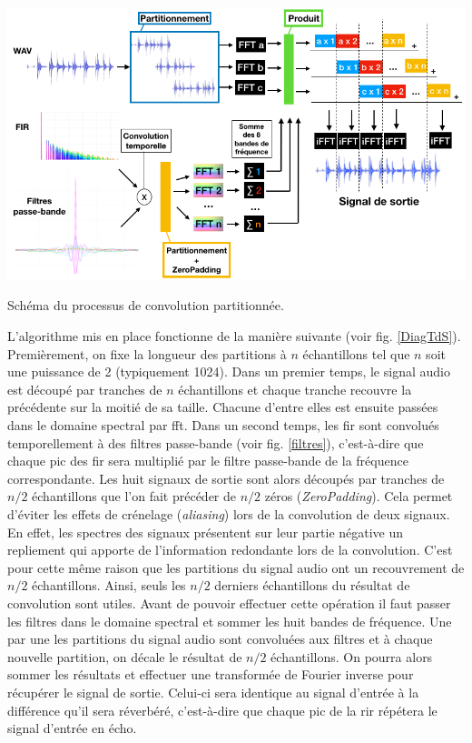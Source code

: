 \begin{figureth}
	\includegraphics[width=\linewidth]{images/DiagTdS}
	\caption{Schéma du processus de convolution partitionnée.}
	\label{DiagTdS}
\end{figureth}
L'algorithme mis en place fonctionne de la manière suivante (voir fig. \ref{DiagTdS}). Premièrement, on fixe la longueur des partitions à $n$ échantillons tel que $n$ soit une puissance de 2 (typiquement 1024). Dans un premier temps, le signal audio est découpé par tranches de $n$ échantillons et chaque tranche recouvre la précédente sur la moitié de sa taille. Chacune d'entre elles est ensuite passées dans le domaine spectral par \gls{fft}. Dans un second temps, les \gls{fir} sont convolués temporellement à des filtres passe-bande (voir fig. \ref{filtres}), c'est-à-dire que chaque pic des \gls{fir} sera multiplié par le filtre passe-bande de la fréquence correspondante. Les huit signaux de sortie sont alors découpés par tranches de $n/2$ échantillons que l'on fait précéder de $n/2$ zéros (\textit{ZeroPadding}). Cela permet d'éviter les effets de crénelage (\textit{aliasing}) lors de la convolution de deux signaux. En effet, les spectres des signaux présentent sur leur partie négative un repliement qui apporte de l'information redondante lors de la convolution. C'est pour cette même raison que les partitions du signal audio ont un recouvrement de $n/2$ échantillons. Ainsi, seuls les $n/2$ derniers échantillons du résultat de convolution sont utiles. Avant de pouvoir effectuer cette opération il faut passer les filtres dans le domaine spectral et sommer les huit bandes de fréquence. Une par une les partitions du signal audio sont convoluées aux filtres et à chaque nouvelle partition, on décale le résultat de $n/2$ échantillons. On pourra alors sommer les résultats et effectuer une transformée de Fourier inverse pour récupérer le signal de sortie. Celui-ci sera identique au signal d'entrée à la différence qu'il sera réverbéré, c'est-à-dire que chaque pic de la \gls{rir} répétera le signal d'entrée en écho.
%


